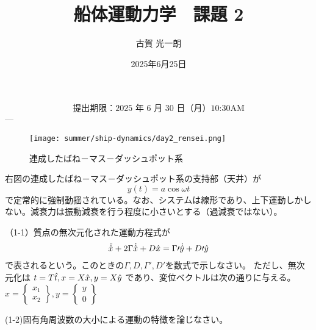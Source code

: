 \documentclass[dvipdfmx,a4paper]{jsarticle}
\title{船体運動力学　課題 2}
\author{古賀 光一朗}
\date{2025年6月25日}
\begin{document}
    \maketitle
    $$\text{提出期限：2025 年 6 月 30 日（月）10:30AM}$$
    ---
    \begin{wrapfigure}{r}[\dimexpr\marginparsep+\marginparwidth]{0.5\linewidth} %
    \centering
    \texttt{[image: summer/ship-dynamics/day2\_rensei.png]}
    \caption{連成したばね－マス－ダッシュポット系}
    \label{fig:damper-system}
    \end{wrapfigure}
右図の連成したばね－マス－ダッシュポット系の支持部（天井）が
\begin{equation}
    y(t)=a\cos{\omega t}
\end{equation}
で定常的に強制動揺されている。なお、システムは線形であり、上下運動しかしない。減衰力は振動減衰を行う程度に小さいとする（過減衰ではない）。


（1-1）質点の無次元化された運動方程式が
\begin{equation}
    \begin{gathered}\ddot{\hat x}+2\Gamma\dot{\hat x}+D\hat x=\Gamma\prime\dot{\hat y}+D\prime\hat y\end{gathered}\\
\end{equation}
で表されるという。このときの$\Gamma, D, \Gamma\prime,D\prime $を数式で示しなさい。
ただし、無次元化は $t=T\hat t , \space x=X\hat x, \space y=X\hat y$ であり、変位ベクトルは次の通りに与える。
$x=\begin{Bmatrix}x_1\\x_2\end{Bmatrix},y=\begin{Bmatrix}y\\0\end{Bmatrix}$


(1-2)固有角周波数の大小による運動の特徴を論じなさい。
\end{document}
